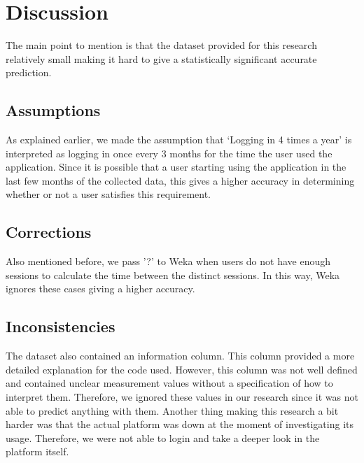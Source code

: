 \section{Discussion}
The main point to mention is that the dataset provided for this research relatively small making it hard to give a statistically significant accurate prediction.

\subsection{Assumptions}
As explained earlier, we made the assumption that ‘Logging in 4 times a year’ is interpreted as logging in once every 3 months for the time the user used the application. Since it is possible that a user starting using the application in the last few months of the collected data, this gives a higher accuracy in determining whether or not a user satisfies this requirement.

\subsection{Corrections}
Also mentioned before, we pass '?' to Weka when users do not have enough sessions to calculate the time between the distinct sessions. In this way, Weka ignores these cases giving a higher accuracy.

\subsection{Inconsistencies}
The dataset also contained an information column. This column provided a more detailed explanation for the code used. However, this column was not well defined and contained unclear measurement values without a specification of how to interpret them. Therefore, we ignored these values in our research since it was not able to predict anything with them. Another thing  making this research a bit harder was that the actual platform was down at the moment of investigating its usage. Therefore, we were not able to login and take a deeper look in the platform itself.